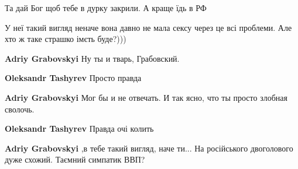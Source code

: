 \begin{itemize}
Та дай Бог щоб тебе в дурку закрили. А краще їдь в РФ

 
У неї такий вигляд неначе вона давно не мала сексу через це всі проблеми. Але хто ж таке страшко імєть буде?)))

\begin{itemize}
 
\textbf{Adriy Grabovskyi} Ну ты и тварь, Грабовский.

 
\textbf{Oleksandr Tashyrev} Просто правда

 
\textbf{Adriy Grabovskyi} Мог бы и не отвечать. И так ясно, что ты просто злобная сволочь.

 
\textbf{Oleksandr Tashyrev} Правда очі колить

 
\textbf{Adriy Grabovskyi} ,в тебе такий вигляд, наче ти... На російського двоголового дуже схожий. Таємний симпатик ВВП?


\end{itemize}
\end{itemize}
